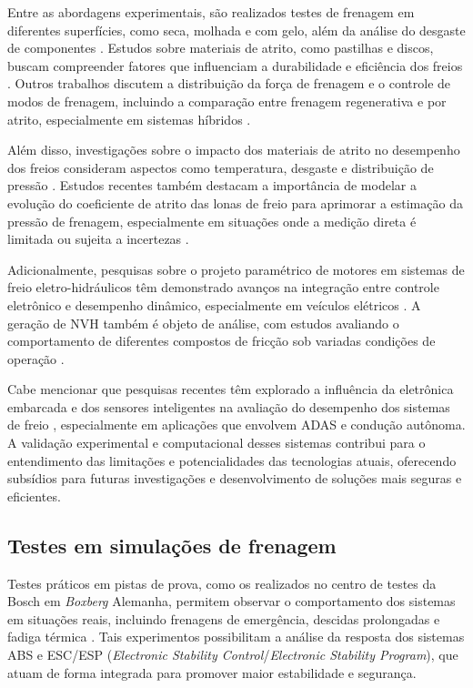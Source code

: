 Entre as abordagens experimentais, são realizados testes de frenagem em diferentes superfícies, como seca, molhada e com gelo, além da análise do desgaste de componentes \cite{Konrad2014}. Estudos sobre materiais de atrito, como pastilhas e discos, buscam compreender fatores que influenciam a durabilidade e eficiência dos freios \cite{Lentin2022}. Outros trabalhos discutem a distribuição da força de frenagem e o controle de modos de frenagem, incluindo a comparação entre frenagem regenerativa e por atrito, especialmente em sistemas híbridos \cite{Donghai2022}.

Além disso, investigações sobre o impacto dos materiais de atrito no desempenho dos freios consideram aspectos como temperatura, desgaste e distribuição de pressão \cite{Rudolf2011}. Estudos recentes também destacam a importância de modelar a evolução do coeficiente de atrito das lonas de freio para aprimorar a estimação da pressão de frenagem, especialmente em situações onde a medição direta é limitada ou sujeita a incertezas \cite{ZhangWang2021}.

Adicionalmente, pesquisas sobre o projeto paramétrico de motores em sistemas de freio eletro-hidráulicos têm demonstrado avanços na integração entre controle eletrônico e desempenho dinâmico, especialmente em veículos elétricos \cite{MotorParametricDesign2023}. A geração de \gls{NVH} também é objeto de análise, com estudos avaliando o comportamento de diferentes compostos de fricção sob variadas condições de operação \cite{AndrewJ2022}.

Cabe mencionar que pesquisas recentes têm explorado a influência da eletrônica embarcada e dos sensores inteligentes na avaliação do desempenho dos sistemas de freio \cite{Lentin2022}, especialmente em aplicações que envolvem ADAS e condução autônoma. A validação experimental e computacional desses sistemas contribui para o entendimento das limitações e potencialidades das tecnologias atuais, oferecendo subsídios para futuras investigações e desenvolvimento de soluções mais seguras e eficientes.

\subsection{Testes em simulações de frenagem}
\label{sec:o-estado-da-arte-5-1}
Testes práticos em pistas de prova, como os realizados no centro de testes da Bosch em \textit{Boxberg} Alemanha, permitem observar o comportamento dos sistemas em situações reais, incluindo frenagens de emergência, descidas prolongadas e fadiga térmica \cite{Rudolf2011}. Tais experimentos possibilitam a análise da resposta dos sistemas ABS e ESC/ESP (\textit{Electronic Stability Control}/\textit{Electronic Stability Program}), que atuam de forma integrada para promover maior estabilidade e segurança.

